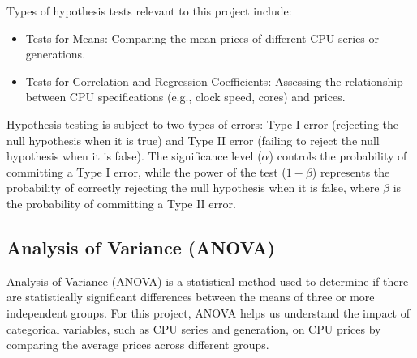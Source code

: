 Types of hypothesis tests relevant to this project include:
\begin{itemize}
    \item Tests for Means: Comparing the mean prices of different CPU series or generations.
    \item Tests for Correlation and Regression Coefficients: Assessing the relationship between CPU specifications (e.g., clock speed, cores) and prices.
\end{itemize}

Hypothesis testing is subject to two types of errors: Type I error (rejecting the null hypothesis when it is true) and Type II error (failing to reject the null hypothesis when it is false). The significance level ($\alpha$) controls the probability of committing a Type I error, while the power of the test ($1-\beta$) represents the probability of correctly rejecting the null hypothesis when it is false, where $\beta$ is the probability of committing a Type II error.

\subsection{Analysis of Variance (ANOVA)}
Analysis of Variance (ANOVA) is a statistical method used to determine if there are statistically significant differences between the means of three or more independent groups. For this project, ANOVA helps us understand the impact of categorical variables, such as CPU series and generation, on CPU prices by comparing the average prices across different groups.\\

